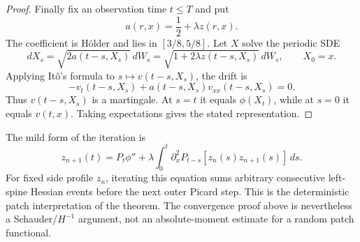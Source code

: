 \begin{proof}
Finally fix an observation time $t\leq T$ and put
\begin{equation*}
  a(r,x)=\frac12+\lambda z(r,x).
\end{equation*}
The coefficient is H\"older and lies in $[3/8,5/8]$. Let $X$ solve the periodic SDE
\begin{equation*}
  dX_s
  =
  \sqrt{2a(t-s,X_s)}\,dW_s
  =
  \sqrt{1+2\lambda z(t-s,X_s)}\,dW_s,
  \qquad X_0=x.
\end{equation*}
Applying It\^o's formula to $s\mapsto v(t-s,X_s)$, the drift is
\begin{equation*}
  -v_t(t-s,X_s)
  +a(t-s,X_s)v_{xx}(t-s,X_s)
  =0.
\end{equation*}
Thus $v(t-s,X_s)$ is a martingale. At $s=t$ it equals $\phi(X_t)$, while at $s=0$ it equals $v(t,x)$. Taking expectations gives the stated representation.
\end{proof}

The mild form of the iteration is
\begin{equation*}
  z_{n+1}(t)
  =
  P_t\phi''
  +\lambda\int_0^t
  \partial_x^2P_{t-s}[z_n(s)z_{n+1}(s)]\,ds.
\end{equation*}
For fixed side profile $z_n$, iterating this equation sums arbitrary consecutive left-spine Hessian events before the next outer Picard step. This is the deterministic patch interpretation of the theorem. The convergence proof above is nevertheless a Schauder/$H^{-1}$ argument, not an absolute-moment estimate for a random patch functional.
